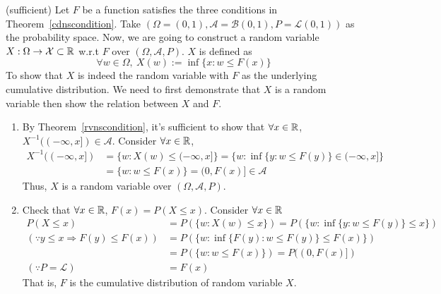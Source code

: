 \documentclass[../Probability_Theory.tex]{subfiles}
\begin{document}
(sufficient) Let $F$ be a function satisfies the three conditions in Theorem~\ref{cdnscondition}. Take $(\Omega=(0,1),\mathcal{A}=\mathcal{B}(0,1),P = \mathcal{L}(0,1))$ as the probability space. Now, we are going to construct a random variable $X:\Omega\rightarrow\mathcal{X}\subset{\mathbb R}$ w.r.t $F$ over $(\Omega,\mathcal{A},P)$. $X$ is defined as
$$\forall w\in\Omega,\ X(w):=\inf\{x:w\leq F(x) \}$$
To show that $X$ is indeed the random variable with $F$ as the underlying cumulative distribution. We need to first demonstrate that $X$ is a random variable then show the relation between $X$ and $F$.
\begin{enumerate}
	\item By Theorem~\ref{rvnscondition}, it's sufficient to show that $\forall x\in{\mathbb R}$, $X^{-1}((-\infty,x])\in\mathcal{A}$. Consider $\forall x\in{\mathbb R}$,
	\begin{align*}
	X^{-1}((-\infty,x]) &= \{w:X(w)\leq(-\infty,x] \} = \{w:\inf\{y:w\leq F(y)\}\in(-\infty,x]  \}\\
	&=\{w:w\leq F(x) \} = (0,F(x)]\in\mathcal{A}
	\end{align*}
	Thus, $X$ is a random variable over $(\Omega,\mathcal{A},P)$.
	\item Check that $\forall x\in{\mathbb R}$, $F(x) = P(X\leq x)$. Consider $\forall x\in{\mathbb R}$
	\begin{align*}
	P(X\leq x) &= P(\{w:X(w)\leq x \}) = P(\{w:\inf\{y:w\leq F(y)\}\leq x \})\\
	(\because y\leq x\Rightarrow F(y)\leq F(x))&=P(\{w:\inf\{F(y):w\leq F(y)\}\leq F(x) \})\\
	&=P(\{w:w\leq F(x) \}) = P((0,F(x)])\\
	(\because P=\mathcal{L})&=F(x)
	\end{align*}
	That is, $F$ is the cumulative distribution of random variable $X$.
\end{enumerate}
\end{document}
